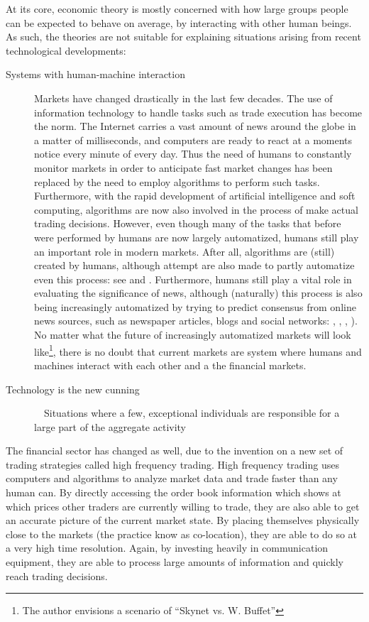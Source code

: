 At its core, economic theory is mostly concerned with how large groups people can be expected to behave on average, by interacting with other human beings. As such, the theories are not suitable for explaining situations arising from recent technological developments:
\begin{description}
\item[Systems with human-machine interaction] Markets have changed drastically in the last few decades. The use of information technology to handle tasks such as trade execution has become the norm. The Internet carries a vast amount of news around the globe in a matter of milliseconds, and computers are ready to react at a moments notice every minute of every day. Thus the need of humans to constantly monitor markets in order to anticipate fast market changes has been replaced by the need to employ algorithms to perform such tasks. Furthermore, with the rapid development of artificial intelligence and soft computing, algorithms are now also involved in the process of make actual trading decisions. However, even though many of the tasks that before were performed by humans are now largely automatized, humans still play an important role in modern markets. After all, algorithms are (still) created by humans, although attempt are also made to partly automatize even this process: see \cite{allen1999using} and \cite{potvin2004generating}. Furthermore, humans still play a vital role in evaluating the significance of news, although (naturally) this process is also being increasingly automatized by trying to predict consensus from online news sources, such as newspaper articles, blogs and social networks: \cite{devitt2007sentiment}, \cite{koppel2006good}, \cite{godbole2007large}, \cite{bollen2011twitter}). No matter what the future of increasingly automatized markets will look like\footnote{The author envisions a scenario of ``Skynet vs. W. Buffet''}, there is no doubt that current markets are system where humans and machines interact with each other and a the financial markets. 
\item[Technology is the new cunning]　Situations where a few, exceptional individuals are responsible for a large part of the aggregate activity
\end{description}
The financial sector has changed as well, due to the invention on a new set of trading strategies called high frequency trading. High frequency trading uses computers and algorithms to analyze market data and trade faster than any human can. By directly accessing the order book information which shows at which prices other traders are currently willing to trade, they are also able to get an accurate picture of the current market state. By placing themselves physically close to the markets (the practice know as co-location), they are able to do so at a very high time resolution. Again, by investing heavily in communication equipment, they are able to process large amounts of information and quickly reach trading decisions.

